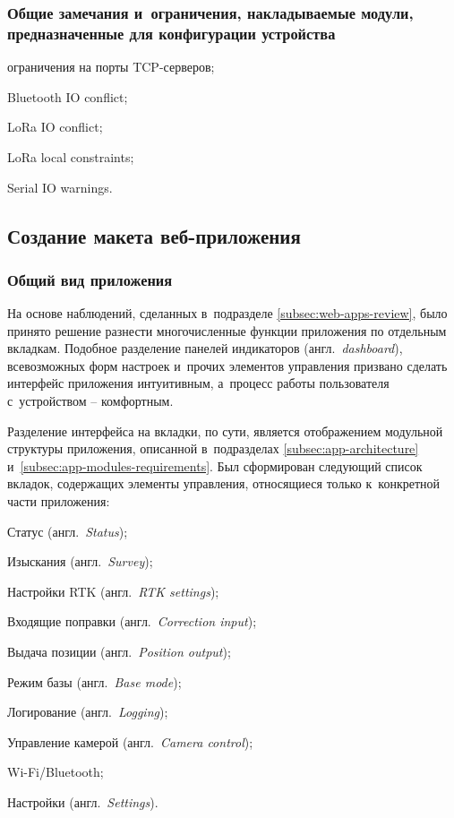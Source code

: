 \subsubsection{Общие замечания и~ограничения, накладываемые модули, предназначенные для конфигурации устройства}

\begin{dashitemize}
  \item ограничения на порты TCP-серверов;
  \item Bluetooth IO conflict;
  \item LoRa IO conflict;
  \item LoRa local constraints;
  \item Serial IO warnings.
\end{dashitemize}

\subsection{Создание макета веб-приложения}
\label{subsec:app-sketch}

\subsubsection{Общий вид приложения}
\label{subsec:app-sketch-general}

На основе наблюдений, сделанных в~подразделе \ref{subsec:web-apps-review}, было принято решение разнести многочисленные функции приложения по отдельным вкладкам. Подобное разделение панелей индикаторов (англ.~\emph{dashboard}), всевозможных форм настроек и~прочих элементов управления призвано сделать интерфейс приложения интуитивным, а~процесс работы пользователя с~устройством -- комфортным.

Разделение интерфейса на вкладки, по сути, является отображением модульной структуры приложения, описанной в~подразделах \ref{subsec:app-architecture} и~\ref{subsec:app-modules-requirements}. Был сформирован следующий список вкладок, содержащих элементы управления, относящиеся только к~конкретной части приложения:

\begin{dashitemize}
  \item Статус (англ.~\emph{Status});
  \item Изыскания (англ.~\emph{Survey});
  \item Настройки RTK (англ.~\emph{RTK settings});
  \item Входящие поправки (англ.~\emph{Correction input});
  \item Выдача позиции (англ.~\emph{Position output});
  \item Режим базы (англ.~\emph{Base mode});
  \item Логирование (англ.~\emph{Logging});
  \item Управление камерой (англ.~\emph{Camera control});
  \item Wi-Fi/Bluetooth;
  \item Настройки (англ.~\emph{Settings}).
\end{dashitemize}

